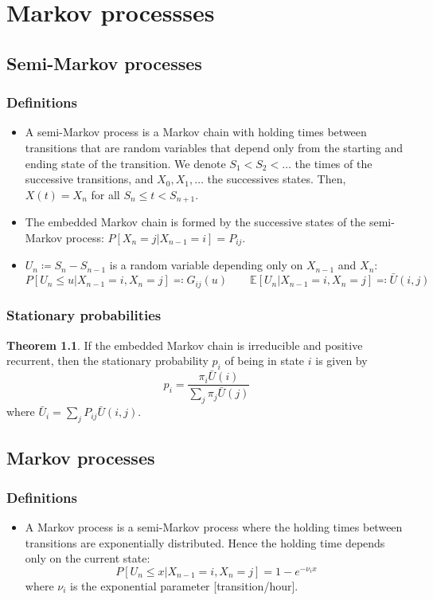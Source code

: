 \documentclass[12pt, openany]{report}
\newcommand{\E}{\mathbb{E}}
\theoremstyle{definition}
\newtheorem{thm}{Theorem}[chapter]
\begin{document}
\chapter{Markov processses}
\section{Semi-Markov processes}
\subsection{Definitions}
\begin{itemize}
	\item A semi-Markov process is a Markov chain with holding times between transitions that are random variables that depend only from the starting and ending state of the transition. We denote $S_1<S_2<\dots$ the times of the successive transitions, and $X_0, X_1,\dots$ the successives states. Then, $X(t)=X_n$ for all $S_n\le t<S_{n+1}$.
	\item The embedded Markov chain is formed by the successive states of the semi-Markov process: $P[X_n=j|X_{n-1}=i] =P_{ij}$.
	\item $U_n\coloneqq S_n-S_{n-1}$ is a random variable depending only on $X_{n-1}$ and $X_n$:
	\begin{equation}
		P[U_n\le u|X_{n-1}=i, X_n=j] \eqqcolon G_{ij}(u)\qquad \E[U_n|X_{n-1}=i, X_n=j] \eqqcolon \bar U(i,j)
	\end{equation}
\end{itemize}
\subsection{Stationary probabilities}
\begin{thm}
	If the embedded Markov chain is irreducible and positive recurrent, then the stationary probability $p_i$ of being in state $i$ is given by
	\begin{equation}
		p_i = \frac{\pi_i \bar U(i)}{\sum_j\pi_j \bar U(j)}
	\end{equation}
	where $\bar U_i = \sum_j P_{ij}\bar U(i,j)$.
\end{thm}
\section{Markov processes}
\subsection{Definitions}
\begin{itemize}
	\item A Markov process is a semi-Markov process where the holding times between transitions are exponentially distributed. Hence the holding time depends only on the current state:
	\begin{equation}
		P[U_n\le x|X_{n-1}=i, X_n=j] = 1-e^{-\nu_{i}x}
	\end{equation}
	where $\nu_i$ is the exponential parameter [transition/hour].
\end{itemize}
\end{document}
